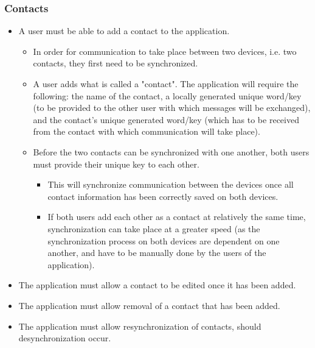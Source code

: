 \subsubsection{Contacts}
\begin{itemize}
\item A user must be able to add a contact to the application.
\begin{itemize}
\item In order for communication to take place between two devices, i.e. two contacts, they first need to be synchronized.
\item A user adds what is called a "contact". The application will require the following: the name of the contact, a locally generated unique word/key (to be provided to the other user with which messages will be exchanged), and the contact's unique generated word/key (which has to be received from the contact with which communication will take place).
\item Before the two contacts can be synchronized with one another, both users must provide their unique key to each other. 
\begin {itemize}
\item This will synchronize communication between the devices once all contact information has been correctly saved on both devices.
\item If both users add each other as a contact at relatively the same time, synchronization can take place at a greater speed (as the synchronization process on both devices are dependent on one another, and have to be manually done by the users of the application).
\end {itemize}
\end{itemize}
\item The application must allow a contact to be edited once it has been added.
\item The application must allow removal of a contact that has been added.
\item The application must allow resynchronization of contacts, should desynchronization occur.
\end{itemize}

